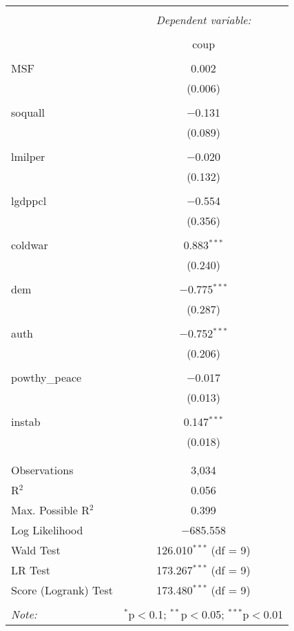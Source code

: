 
\begin{table}[!htbp] \centering 
  \caption{} 
  \label{} 
\begin{tabular}{@{\extracolsep{5pt}}lc} 
\\[-1.8ex]\hline 
\hline \\[-1.8ex] 
 & \multicolumn{1}{c}{\textit{Dependent variable:}} \\ 
\cline{2-2} 
\\[-1.8ex] & coup \\ 
\hline \\[-1.8ex] 
 MSF & 0.002 \\ 
  & (0.006) \\ 
  & \\ 
 soquall & $-$0.131 \\ 
  & (0.089) \\ 
  & \\ 
 lmilper & $-$0.020 \\ 
  & (0.132) \\ 
  & \\ 
 lgdppcl & $-$0.554 \\ 
  & (0.356) \\ 
  & \\ 
 coldwar & 0.883$^{***}$ \\ 
  & (0.240) \\ 
  & \\ 
 dem & $-$0.775$^{***}$ \\ 
  & (0.287) \\ 
  & \\ 
 auth & $-$0.752$^{***}$ \\ 
  & (0.206) \\ 
  & \\ 
 powthy\_peace & $-$0.017 \\ 
  & (0.013) \\ 
  & \\ 
 instab & 0.147$^{***}$ \\ 
  & (0.018) \\ 
  & \\ 
\hline \\[-1.8ex] 
Observations & 3,034 \\ 
R$^{2}$ & 0.056 \\ 
Max. Possible R$^{2}$ & 0.399 \\ 
Log Likelihood & $-$685.558 \\ 
Wald Test & 126.010$^{***}$ (df = 9) \\ 
LR Test & 173.267$^{***}$ (df = 9) \\ 
Score (Logrank) Test & 173.480$^{***}$ (df = 9) \\ 
\hline 
\hline \\[-1.8ex] 
\textit{Note:}  & \multicolumn{1}{r}{$^{*}$p$<$0.1; $^{**}$p$<$0.05; $^{***}$p$<$0.01} \\ 
\end{tabular} 
\end{table} 
